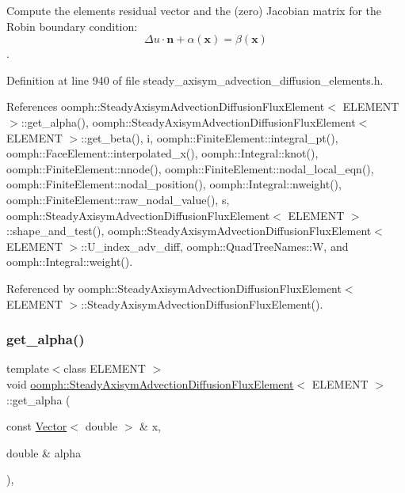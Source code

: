 Compute the element\textquotesingle{}s residual vector and the (zero) Jacobian matrix for the Robin boundary condition\+: \[ \Delta u \cdot \mathbf{n} + \alpha (\mathbf{x}) = \beta (\mathbf{x}) \]. 

Definition at line 940 of file steady\+\_\+axisym\+\_\+advection\+\_\+diffusion\+\_\+elements.\+h.



References oomph\+::\+Steady\+Axisym\+Advection\+Diffusion\+Flux\+Element$<$ E\+L\+E\+M\+E\+N\+T $>$\+::get\+\_\+alpha(), oomph\+::\+Steady\+Axisym\+Advection\+Diffusion\+Flux\+Element$<$ E\+L\+E\+M\+E\+N\+T $>$\+::get\+\_\+beta(), i, oomph\+::\+Finite\+Element\+::integral\+\_\+pt(), oomph\+::\+Face\+Element\+::interpolated\+\_\+x(), oomph\+::\+Integral\+::knot(), oomph\+::\+Finite\+Element\+::nnode(), oomph\+::\+Finite\+Element\+::nodal\+\_\+local\+\_\+eqn(), oomph\+::\+Finite\+Element\+::nodal\+\_\+position(), oomph\+::\+Integral\+::nweight(), oomph\+::\+Finite\+Element\+::raw\+\_\+nodal\+\_\+value(), s, oomph\+::\+Steady\+Axisym\+Advection\+Diffusion\+Flux\+Element$<$ E\+L\+E\+M\+E\+N\+T $>$\+::shape\+\_\+and\+\_\+test(), oomph\+::\+Steady\+Axisym\+Advection\+Diffusion\+Flux\+Element$<$ E\+L\+E\+M\+E\+N\+T $>$\+::\+U\+\_\+index\+\_\+adv\+\_\+diff, oomph\+::\+Quad\+Tree\+Names\+::W, and oomph\+::\+Integral\+::weight().



Referenced by oomph\+::\+Steady\+Axisym\+Advection\+Diffusion\+Flux\+Element$<$ E\+L\+E\+M\+E\+N\+T $>$\+::\+Steady\+Axisym\+Advection\+Diffusion\+Flux\+Element().

\mbox{\label{classoomph_1_1SteadyAxisymAdvectionDiffusionFluxElement_a05b2100ef0a2054ea9d47111c19d82fb}} 
\subsubsection{\texorpdfstring{get\+\_\+alpha()}{get\_alpha()}}
{\footnotesize\ttfamily template$<$class E\+L\+E\+M\+E\+NT $>$ \\
void \hyperlink{classoomph_1_1SteadyAxisymAdvectionDiffusionFluxElement}{oomph\+::\+Steady\+Axisym\+Advection\+Diffusion\+Flux\+Element}$<$ E\+L\+E\+M\+E\+NT $>$\+::get\+\_\+alpha (\begin{DoxyParamCaption}\item[{const \hyperlink{classoomph_1_1Vector}{Vector}$<$ double $>$ \&}]{x,  }\item[{double \&}]{alpha }\end{DoxyParamCaption})\hspace{0.3cm}{\ttfamily [inline]}, {\ttfamily [protected]}}



